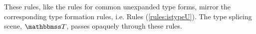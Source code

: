 These rules, like the rules for common unexpanded type forms,  mirror the corresponding type formation rules, i.e. Rules (\ref{rules:istypeU}). The type splicing scene, $\tscenev$, passes opaquely through these rules. 

